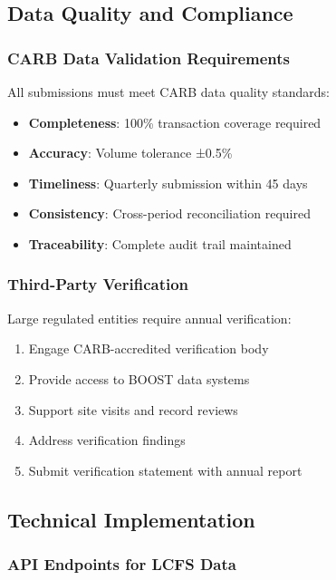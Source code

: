\subsection{Data Quality and Compliance}
\label{sec:lcfs-data-quality}

\subsubsection{CARB Data Validation Requirements}

All submissions must meet CARB data quality standards:

\begin{itemize}
    \item \textbf{Completeness}: 100\% transaction coverage required
    \item \textbf{Accuracy}: Volume tolerance ±0.5\%
    \item \textbf{Timeliness}: Quarterly submission within 45 days
    \item \textbf{Consistency}: Cross-period reconciliation required
    \item \textbf{Traceability}: Complete audit trail maintained
\end{itemize}

\subsubsection{Third-Party Verification}

Large regulated entities require annual verification:

\begin{enumerate}
    \item Engage CARB-accredited verification body
    \item Provide access to BOOST data systems
    \item Support site visits and record reviews
    \item Address verification findings
    \item Submit verification statement with annual report
\end{enumerate}

\subsection{Technical Implementation}
\label{sec:lcfs-technical}

\subsubsection{API Endpoints for LCFS Data}

